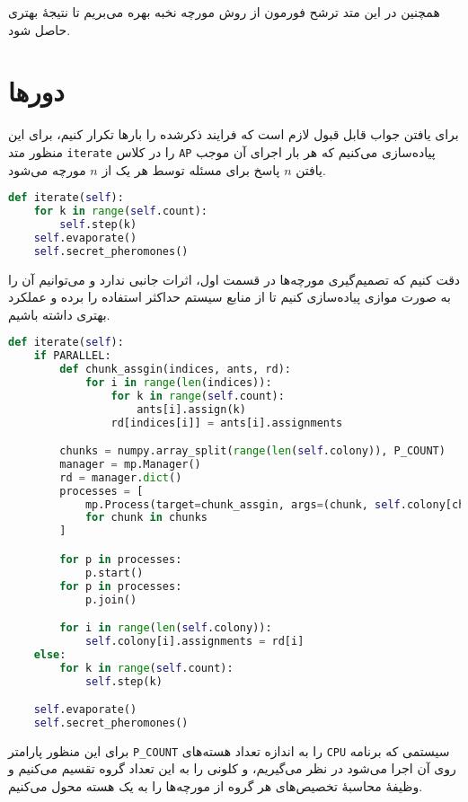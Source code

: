 \documentclass[a4paper, 12pt]{article}
\theoremstyle{definition}
\begin{document}
همچنین در این متد ترشح فورمون از روش مورچه نخبه بهره می‌بریم تا نتیجهٔ بهتری حاصل شود.

\section{دورها}

برای یافتن جواب قابل قبول لازم است که فرایند ذکرشده را بارها تکرار کنیم، برای این منظور متد
\texttt{iterate}
را در کلاس
\texttt{AP}
پیاده‌سازی می‌کنیم که هر بار اجرای آن موجب یافتن
$n$
پاسخ برای مسئله توسط هر یک از
$n$
مورچه می‌شود.

\LTR
\begin{lstlisting}[language=Python]
def iterate(self):
    for k in range(self.count):
        self.step(k)
    self.evaporate()
    self.secret_pheromones()
\end{lstlisting}
\RTL

دقت کنیم که تصمیم‌گیری مورچه‌ها در قسمت اول، اثرات جانبی ندارد و می‌توانیم آن را به صورت موازی پیاده‌سازی کنیم تا از منابع سیستم حداکثر استفاده را برده و عملکرد بهتری داشته باشیم.

\LTR
\begin{lstlisting}[language=Python]
def iterate(self):
    if PARALLEL:
        def chunk_assgin(indices, ants, rd):
            for i in range(len(indices)):
                for k in range(self.count):
                    ants[i].assign(k)
                rd[indices[i]] = ants[i].assignments

        chunks = numpy.array_split(range(len(self.colony)), P_COUNT)
        manager = mp.Manager()
        rd = manager.dict()
        processes = [
            mp.Process(target=chunk_assgin, args=(chunk, self.colony[chunk[0]:chunk[-1] + 1], rd))
            for chunk in chunks
        ]

        for p in processes:
            p.start()
        for p in processes:
            p.join()

        for i in range(len(self.colony)):
            self.colony[i].assignments = rd[i]
    else:
        for k in range(self.count):
            self.step(k)

    self.evaporate()
    self.secret_pheromones()
\end{lstlisting}
\RTL

برای این منظور پارامتر
\texttt{P\_COUNT}
را به اندازه تعداد هسته‌های
\texttt{CPU}
سیستمی که برنامه روی آن اجرا می‌شود در نظر می‌گیریم، و کلونی را به این تعداد گروه تقسیم می‌کنیم و وظیفهٔ محاسبهٔ تخصیص‌های هر گروه از مورچه‌ها را به یک هسته محول می‌کنیم.
\end{document}
